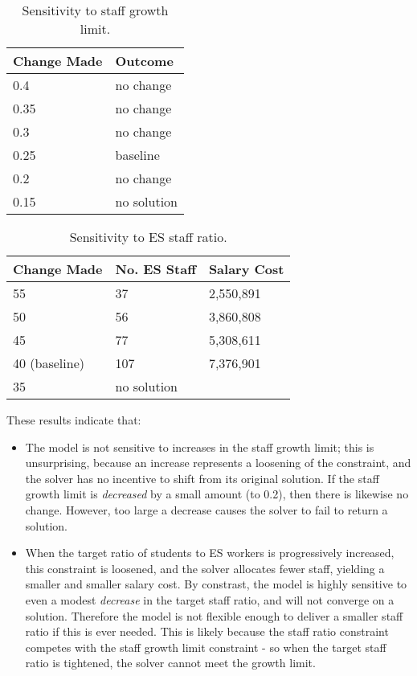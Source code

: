 \documentclass[11pt, a4paper]{article}
\begin{document}
    \begin{table}[!ht]
        \centering
        \caption{Sensitivity to staff growth limit.}
        \begin{tabular}{|l|l|}
        \hline
            Change Made & Outcome \\ \hline
            0.4 & no change \\ \hline
            0.35 & no change \\ \hline
            0.3 & no change \\ \hline
            0.25 & baseline \\ \hline
            0.2 & no change \\ \hline
            0.15 & no solution \\ \hline
        \end{tabular}
        \label{sens1}
    \end{table}

    \begin{table}[!ht]
        \centering
        \caption{Sensitivity to ES staff ratio.}
        \begin{tabular}{|l|l|l|}
        \hline
            Change Made & No. ES Staff & Salary Cost \\ \hline
            55 & 37 & 2,550,891 \\ \hline
            50 & 56 & 3,860,808 \\ \hline
            45 & 77 & 5,308,611 \\ \hline 
            40 (baseline) & 107 & 7,376,901 \\ \hline
            35 & no solution & ~ \\ \hline
        \end{tabular}
        \label{sens2}
    \end{table}

    These results indicate that:

    \begin{itemize}
        \item The model is not sensitive to increases in the staff growth limit; this is unsurprising, because an increase represents a loosening of the constraint, and the solver has no incentive to shift from its original solution. If the staff growth limit is \textit{decreased} by a small amount (to 0.2), then there is likewise no change. However, too large a decrease causes the solver to fail to return a solution.
        \item When the target ratio of students to ES workers is progressively increased, this constraint is loosened, and the solver allocates fewer staff, yielding a smaller and smaller salary cost. By constrast, the model is highly sensitive to even a modest \textit{decrease} in the target staff ratio, and will not converge on a solution. Therefore the model is not flexible enough to deliver a smaller staff ratio if this is ever needed. This is likely because the staff ratio constraint competes with the staff growth limit constraint - so when the target staff ratio is tightened, the solver cannot meet the growth limit.
    \end{itemize}
    
\end{document}
